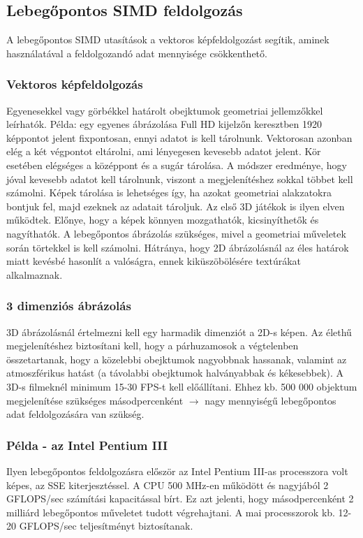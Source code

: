 \subsection{Lebegőpontos SIMD feldolgozás}
A lebegőpontos SIMD utasítások a vektoros képfeldolgozást segítik, aminek használatával a feldolgozandó adat mennyisége csökkenthető.
\subsubsection{Vektoros képfeldolgozás}
Egyenesekkel vagy görbékkel határolt obejktumok geometriai jellemzőkkel leírhatók.
Példa: egy egyenes ábrázolása Full HD kijelzőn keresztben 1920 képpontot jelent fixpontosan, ennyi adatot is kell tárolnunk.
Vektorosan azonban elég a két végpontot eltárolni, ami lényegesen kevesebb adatot jelent.
Kör esetében elégséges a középpont és a sugár tárolása.
A módszer eredménye, hogy jóval kevesebb adatot kell tárolnunk, viszont a megjelenítéshez sokkal többet kell számolni.
Képek tárolása is lehetséges így, ha azokat geometriai alakzatokra bontjuk fel, majd ezeknek az adatait tároljuk.
Az első 3D játékok is ilyen elven működtek.
Előnye, hogy a képek könnyen mozgathatók, kicsinyíthetők és nagyíthatók.
A lebegőpontos ábrázolás szükséges, mivel a geometriai műveletek során törtekkel is kell számolni.
Hátránya, hogy 2D ábrázolásnál az éles határok miatt kevésbé hasonlít a valóságra, ennek kiküszöbölésére textúrákat alkalmaznak.
\subsubsection{3 dimenziós ábrázolás}
3D ábrázolásnál értelmezni kell egy harmadik dimenziót a 2D-s képen.
Az élethű megjelenítéshez biztosítani kell, hogy a párhuzamosok a végtelenben összetartanak, hogy a közelebbi obejktumok nagyobbnak hassanak, valamint az atmoszférikus hatást (a távolabbi obejktumok halványabbak és kékesebbek).
A 3D-s filmeknél minimum 15-30 FPS-t kell előállítani.
Ehhez kb. 500 000 objektum megjelenítése szükséges másodpercenként $\rightarrow$ nagy mennyiségű lebegőpontos adat feldolgozására van szükség.
\subsubsection{Példa - az Intel Pentium III}
Ilyen lebegőpontos feldolgozásra először az Intel Pentium III-as processzora volt képes, az SSE kiterjesztéssel.
A CPU 500 MHz-en működött és nagyjából 2 GFLOPS/sec számítási kapacitással bírt.
Ez azt jelenti, hogy másodpercenként 2 milliárd lebegőpontos műveletet tudott végrehajtani.
A mai processzorok kb. 12-20 GFLOPS/sec teljesítményt biztosítanak.
